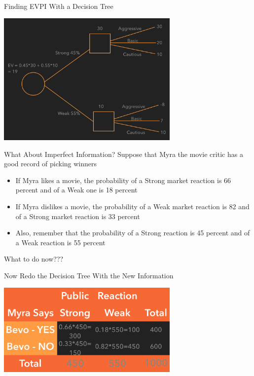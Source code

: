 \documentclass{beamer}\usepackage[]{graphicx}\usepackage[]{color}
\begin{document}
\begin{darkframes}
\begin{frame}[fragile]{Finding EVPI With a Decision Tree}
        \begin{center}
        \includegraphics[width=3.5in]{BevoPerfectInfo} 
        \end{center}
    
    \lc %
    \end{frame}  


    \begin{frame}[fragile]{What About Imperfect Information?}
      Suppose that Myra the movie critic has a good record of picking winners
      \begin{itemize} [<+->]
        \item If Myra likes a movie, the probability of a Strong market reaction is 66 percent and of a Weak one is 18 percent
        \item If Myra dislikes a movie, the probability of a Weak market reaction is 82 and of a Strong market reaction is 33 percent 
        \item Also, remember that the probability of a Strong reaction is 45 percent and of a Weak reaction is 55 percent
      \end{itemize}

      \pause
      What to do now???

      \lc %
    \end{frame}


    \begin{frame}[fragile]{Now Redo the Decision Tree With the New Information}

      \begin{center}
        \includegraphics[width=3.5in]{MyraPayoffs} \\
      \end{center}


\end{frame}
\end{darkframes}
\end{document}
